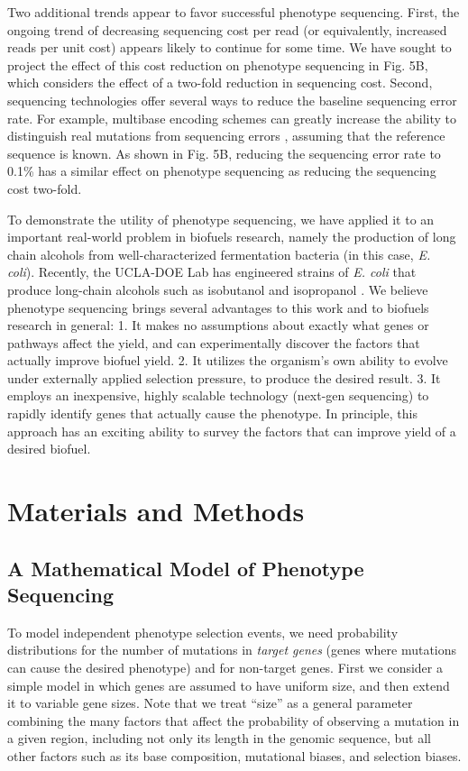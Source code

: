 \documentclass[letterpaper,10pt,english]{howto}
\begin{document}
Two additional trends appear to favor successful phenotype
sequencing.  First, the ongoing trend of decreasing sequencing cost
per read (or equivalently, increased reads per unit cost) appears
likely to continue for some time.  We have sought to project the
effect of this cost reduction on phenotype sequencing in Fig. 5B,
which considers the effect of a two-fold reduction
in sequencing cost.  Second, sequencing technologies offer several
ways to reduce the baseline sequencing error rate.  For example,
multibase encoding schemes can greatly
increase the ability to distinguish real mutations from
sequencing errors \cite{McKernan2009} ,
assuming that the reference sequence is known.
As shown in Fig. 5B, reducing the sequencing error rate to 0.1\%
has a similar effect on phenotype sequencing as reducing the
sequencing cost two-fold.

To demonstrate the utility of phenotype sequencing, we have
applied it to an important real-world problem in biofuels
research, namely the production of long chain alcohols from
well-characterized fermentation bacteria (in this case, \emph{E. coli}).
Recently, the UCLA-DOE Lab has engineered strains of \emph{E. coli} that produce long-chain alcohols such as isobutanol and isopropanol \cite{Atsumi08}  \cite{Hanai07} .  We believe phenotype sequencing brings several advantages to this work and to biofuels research in general: 1. It makes no assumptions about exactly what genes or pathways affect the yield, and can experimentally discover the factors that actually improve biofuel yield. 2. It utilizes the organism's own ability to evolve under externally applied selection pressure, to produce the desired result.  3. It employs an inexpensive, highly scalable technology (next-gen sequencing) to rapidly identify genes that actually cause the phenotype.  In principle, this approach has an exciting ability to survey the factors that can improve yield of a desired biofuel.


\section{Materials and Methods}


\subsection{A Mathematical Model of Phenotype Sequencing}

To model independent phenotype selection events, we need probability
distributions for the number of mutations in \emph{target genes} (genes
where mutations can cause the desired phenotype) and for non-target genes.
First we consider a simple model in which genes are assumed to
have uniform size, and then extend it to variable gene sizes.
Note that we treat ``size'' as a general parameter combining the many
factors that affect the probability of observing a mutation in
a given region, including not only its length in the genomic sequence,
but all other factors such as its base composition, mutational biases,
and selection biases.
\end{document}
